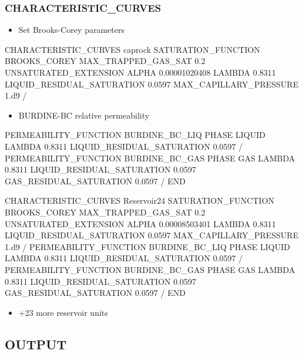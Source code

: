 \documentclass{beamer}
\begin{document}
\begin{frame}\frametitle{CHARACTERISTIC\_CURVES}

\begin{itemize}
\item Set Brooks-Corey parameters
\end{itemize}

\begin{semiverbatim}
CHARACTERISTIC_CURVES caprock
  SATURATION_FUNCTION BROOKS_COREY
    MAX_TRAPPED_GAS_SAT 0.2
    UNSATURATED_EXTENSION
    ALPHA 0.00001020408
    LAMBDA 0.8311
    LIQUID_RESIDUAL_SATURATION 0.0597
    MAX_CAPILLARY_PRESSURE 1.d9
  / 
\newpage
\begin{itemize}
\item BURDINE-BC relative permeability
\end{itemize}
  PERMEABILITY_FUNCTION BURDINE_BC_LIQ
    PHASE LIQUID
    LAMBDA 0.8311
    LIQUID_RESIDUAL_SATURATION 0.0597
  /
  PERMEABILITY_FUNCTION BURDINE_BC_GAS
    PHASE GAS
    LAMBDA 0.8311
    LIQUID_RESIDUAL_SATURATION 0.0597
    GAS_RESIDUAL_SATURATION 0.0597
  /
END
\end{semiverbatim}

\newpage

\begin{semiverbatim}
CHARACTERISTIC_CURVES Reservoir24
  SATURATION_FUNCTION BROOKS_COREY
    MAX_TRAPPED_GAS_SAT 0.2
    UNSATURATED_EXTENSION
    ALPHA 0.00008503401
    LAMBDA 0.8311
    LIQUID_RESIDUAL_SATURATION 0.0597
    MAX_CAPILLARY_PRESSURE 1.d9
  /
\newpage
  PERMEABILITY_FUNCTION BURDINE_BC_LIQ
    PHASE LIQUID
    LAMBDA 0.8311
    LIQUID_RESIDUAL_SATURATION 0.0597
  /
  PERMEABILITY_FUNCTION BURDINE_BC_GAS
    PHASE GAS
    LAMBDA 0.8311
    LIQUID_RESIDUAL_SATURATION 0.0597
    GAS_RESIDUAL_SATURATION 0.0597
  /
END
\end{semiverbatim}

\newpage
\begin{itemize}
  \item +23 more reservoir units
\end{itemize}

\end{frame}

\subsection{OUTPUT}
\end{document}
